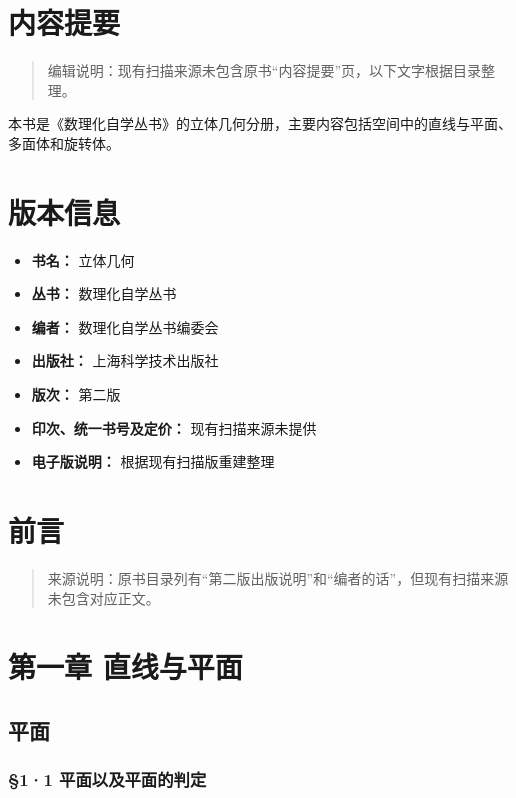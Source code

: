 \chapter*{内容提要}

\begin{quote}
编辑说明：现有扫描来源未包含原书``内容提要''页，以下文字根据目录整理。
\end{quote}

本书是《数理化自学丛书》的立体几何分册，主要内容包括空间中的直线与平面、多面体和旋转体。

\chapter*{版本信息}

\begin{itemize}
\item
  \textbf{书名：} 立体几何
\item
  \textbf{丛书：} 数理化自学丛书
\item
  \textbf{编者：} 数理化自学丛书编委会
\item
  \textbf{出版社：} 上海科学技术出版社
\item
  \textbf{版次：} 第二版
\item
  \textbf{印次、统一书号及定价：} 现有扫描来源未提供
\item
  \textbf{电子版说明：} 根据现有扫描版重建整理
\end{itemize}

\chapter{前言}

\begin{quote}
来源说明：原书目录列有``第二版出版说明''和``编者的话''，但现有扫描来源未包含对应正文。
\end{quote}

\chapter{第一章
直线与平面}

\section{平面}

\subsection{§1·1
平面以及平面的判定}

